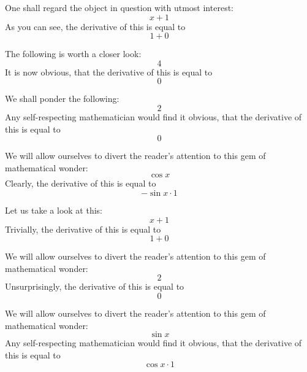 \documentclass{article}
\begin{document}
One shall regard the object in question with utmost interest:
\begin{equation}
x + 1 
\end{equation}
As you can see, the derivative of this is equal to
\begin{equation}
1 + 0 
\end{equation}

The following is worth a closer look:
\begin{equation}
4 
\end{equation}
It is now obvious, that the derivative of this is equal to
\begin{equation}
0 
\end{equation}

We shall ponder the following:
\begin{equation}
2 
\end{equation}
Any self-respecting mathematician would find it obvious, that the derivative of this is equal to
\begin{equation}
0 
\end{equation}

We will allow ourselves to divert the reader's attention to this gem of mathematical wonder:
\begin{equation}
\cos x 
\end{equation}
Clearly, the derivative of this is equal to
\begin{equation}
-\sin x \cdot 1 
\end{equation}

Let us take a look at this:
\begin{equation}
x + 1 
\end{equation}
Trivially, the derivative of this is equal to
\begin{equation}
1 + 0 
\end{equation}

We will allow ourselves to divert the reader's attention to this gem of mathematical wonder:
\begin{equation}
2 
\end{equation}
Unsurprisingly, the derivative of this is equal to
\begin{equation}
0 
\end{equation}

We will allow ourselves to divert the reader's attention to this gem of mathematical wonder:
\begin{equation}
\sin x 
\end{equation}
Any self-respecting mathematician would find it obvious, that the derivative of this is equal to
\begin{equation}
\cos x \cdot 1 
\end{equation}
\end{document}
